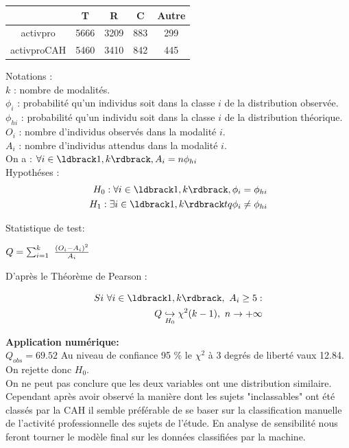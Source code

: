 \documentclass{book}
\begin{document}
\begin{center}
\setlength\arrayrulewidth{.1pt}
\begin{tabular}{|c||c|c|c|c|}
\hline
	& T & R & C & Autre\\
\hline
\hline
activpro & 5666 & 3209 & 883 & 299\\
\hline
activproCAH & 5460 & 3410 & 842 & 445\\
\hline
\end{tabular}
\end{center}
\noindent
Notations : \\
$k$ : nombre de modalités.\\
$\phi_i$ : probabilité qu'un individus soit dans la classe $i$ de la distribution observée.\\ 
$\phi_{hi}$ : probabilité qu'un individu soit dans la classe $i$ de la distribution théorique.\\
$O_i$ : nombre d'individus observés dans la modalité $i$.\\
$A_i$ : nombre d'individus attendus dans la modalité $i$.\\
On a : $\forall i \in \ldbrack 1,k \rdbrack , A_i = n \phi_{hi}$\\

\noindent
Hypothéses :
\begin{align*}
H_0 : \forall i \in \ldbrack 1,k \rdbrack ,\phi_i = \phi_{hi}\\
H_1 : \exists i \in \ldbrack 1,k \rdbrack tq \phi_i \neq \phi_{hi}
\end{align*}

\noindent
Statistique de test:
\begin{center}
$Q = \sum_{i=1}^k ~{{(O_i - A _i)^2} \over {A_i}}$
\end{center}

\noindent
D'après le Théorème de Pearson : 

\begin{align*}
Si ~\forall i  \in \ldbrack 1,k \rdbrack, ~ A_i \geq 5 :\\
Q \underset {\small{H_0}}{\hookrightarrow} \chi ^{2} (k-1) , ~ n \rightarrow +\infty
\end{align*}


\noindent
\textbf{Application numérique:} \\
\noindent
 $Q_{obs} = 69.52$ 
Au niveau de confiance 95 \% le $\chi ^2$ à 3 degrés de liberté vaux 12.84.\\
On rejette donc $H_0$.
\\
\noindent
On ne peut pas conclure que les deux variables ont une distribution similaire. Cependant après avoir observé la manière dont les sujets "inclassables" ont été classés par la CAH il semble préférable de se baser sur la classification manuelle de l'activité professionnelle des sujets de l'étude. En analyse de sensibilité nous feront tourner le modèle final sur les données classifiées par la machine.\\
\end{document}
